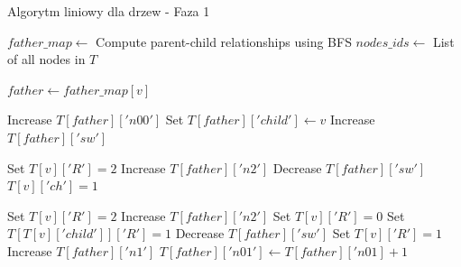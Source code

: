 \begin{algorithm}
    \caption*{Algorytm liniowy dla drzew - Faza 1}
    \begin{algorithmic}[1]
            \State $father\_map \gets$ Compute parent-child relationships using BFS
            \State $nodes\_ids \gets$ List of all nodes in $T$
    
                \State $father \gets father\_map[v]$
    
                    \State Increase $T[father]['n00']$
                    \State Set $T[father]['child'] \gets v$
                \Else
                        \State Increase $T[father]['sw']$
                    \EndIf
    
                        \State Set $T[v]['R'] = 2$
                            \State Increase $T[father]['n2']$
                                \State Decrease $T[father]['sw']$
                            \EndIf
                        \EndIf
                        \State $T[v]['ch'] = 1$
                    \EndIf
    
                            \State Set $T[v]['R'] = 2$
                                \State Increase $T[father]['n2']$
                            \EndIf
                            \State Set $T[v]['R'] = 0$
                            \State Set $T[T[v]['child']]['R'] = 1$
                                \State Decrease $T[father]['sw']$
                            \EndIf
                        \EndIf
                        \State Set $T[v]['R'] = 1$
                            \State Increase $T[father]['n1']$
                        \EndIf
                    \EndIf
                    \EndIf
                        \State $T[father]['n01'] \gets T[father]['n01] + 1$
                    \EndIf


\end{algorithmic}
\end{algorithm}
